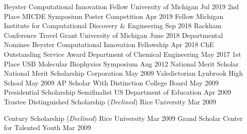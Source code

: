 \begin{cvhonors}
  \cvhonor
    {Beyster Computational Innovation Fellow} %
    {University of Michigan} %
    {} %
    {Jul 2019} %
  \cvhonor
    {2nd Place} %
    {MICDE Symposium Poster Competition} %
    {} %
    {Apr 2019} %
  \cvhonor
    {Fellow} %
    {Michigan Institute for Computational Discovery \& Engineering} %
    {} %
    {Sep 2018} %
\ifextended
  \cvhonor
    {Rackham Conference Travel Grant} %
    {University of Michigan} %
    {} %
    {June 2018} %
  \cvhonor
    {Departmental Nominee} %
    {Beyster Computational Innovation Fellowship} %
    {} %
    {Apr 2018} %
  \cvhonor
    {ChE Outstanding Service Award} %
    {Department of Chemical Engineering} %
    {} %
    {May 2017} %
\fi
\ifoutdated
  \cvhonor
    {1st Place} %
    {USB Molecular Biophysics Symposium} %
    {} %
    {Aug 2012} %
  \cvhonor
    {National Merit Scholar} %
    {National Merit Scholarship Corporation} %
    {} %
    {May 2009} %
  \cvhonor
    {Valedictorian} %
    {Lynbrook High School} %
    {} %
    {May 2009} %
  \cvhonor
    {AP Scholar With Distinction} %
    {College Board} %
    {} %
    {May 2009} %
  \cvhonor
    {Presidential Scholarship Semifinalist} %
    {US Department of Education} %
    {} %
    {Apr 2009} %
  \cvhonor
    {Trustee Distinguished Scholarship (\emph{Declined})} %
    {Rice University} %
    {} %
    {Mar 2009} %

  \cvhonor
    {Century Scholarship (\emph{Declined})} %
    {Rice University} %
    {} %
    {Mar 2009} %
  \cvhonor
    {Grand Scholar} %
    {Center for Talented Youth} %
    {} %
    {Mar 2009} %
\fi
\end{cvhonors}
